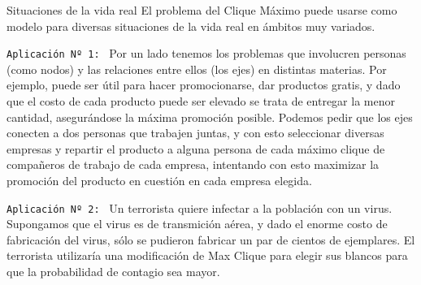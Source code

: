 \documentclass[12pt,titlepage]{article}
\newcommand{\Pa}{\vspace{5mm}}
\begin{document}
	\begin{section}{Situaciones de la vida real}
		El problema del Clique Máximo puede usarse como modelo para diversas situaciones de la vida real en ámbitos muy variados.\Pa
		
		\texttt{Aplicación Nº 1: }
			Por un lado tenemos los problemas que involucren personas (como nodos) y las relaciones entre ellos (los ejes) en distintas materias. Por ejemplo, puede ser útil para hacer promocionarse, dar productos gratis, y dado que el costo de cada producto puede ser elevado se trata de entregar la menor cantidad, asegurándose la máxima promoción posible. Podemos pedir que los ejes conecten a dos personas que trabajen juntas, y con esto seleccionar diversas empresas y repartir el producto a alguna persona de cada máximo clique de compañeros de trabajo de cada empresa, intentando con esto maximizar la promoción del producto en cuestión en cada empresa elegida.\Pa %


			
		\texttt{Aplicación Nº 2: }
			Un terrorista quiere infectar a la población con un virus. Supongamos que el virus es de transmición aérea, y dado el enorme costo de fabricación del virus, sólo se pudieron fabricar un par de cientos de ejemplares. El terrorista utilizaría una modificación de Max Clique para elegir sus blancos para que la probabilidad de contagio sea mayor. 
	\newpage
	\end{section}
	
	
\end{document}
